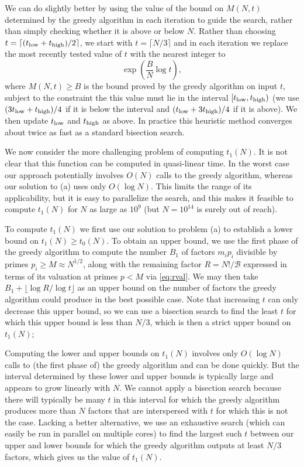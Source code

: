 \documentclass[12pt,a4paper,reqno]{amsart}
\numberwithin{equation}{section}
\theoremstyle{plain}
\theoremstyle{definition}
\newcommand\tuple{{\mathcal B}}
\begin{document}
We can do slightly better by using the value of the bound on $M(N,t)$ determined by the greedy algorithm in each iteration to guide the search, rather than simply checking whether it is above or below $N$.  Rather than choosing $t=\lceil(t_{\rm low}+t_{\rm high})/2\rceil$, we start with $t=\lceil N/3\rceil$ and in each iteration we replace the most recently tested value of $t$ with the nearest integer to
\[
\exp\left(\frac{B}{N}\log t\right),
\]
where $M(N,t)\ge B$ is the bound proved by the greedy algorithm on input $t$,  subject to the constraint the this value must lie in the interval $[t_{\rm low},t_{\rm high})$
(we use $(3t_{\rm low}+t_{\rm high})/4$ if it is below the interval and $(t_{\rm low}+3t_{\rm high})/4$ if it is above).  We then update $t_{\rm low}$ and $t_{\rm high}$ as above.
In practice this heuristic method converges about twice as fast as a standard bisection search.

We now consider the more challenging problem of computing $t_1(N)$.  It is not clear that this function can be computed in quasi-linear time.  In the worst case our approach potentially involves $O(N)$ calls to the greedy algorithm, whereas our solution to (a) uses only $O(\log N)$.  This limits the range of its applicability, but it is easy to parallelize the search, and this makes it feasible to compute $t_1(N)$ for $N$ as large as $10^9$ (but $N=10^{14}$ is surely out of reach).

To compute $t_1(N)$ we first use our solution to problem (a) to establish a lower bound on $t_1(N)\ge t_0(N)$.  To obtain an upper bound, we use the first phase of the greedy algorithm to compute the number $B_1$ of factors $m_ip_i$ divisible by primes $p_i\ge M\approx N^{1/2}$, along with the remaining factor $R=N!/\tuple$ expressed in terms of its valuation at primes $p < M$ via \eqref{eq:rval}.
We may then take $B_1 + \lfloor \log R / \log t\rfloor$ as an upper bound on the number of factors the greedy algorithm could produce in the best possible case. Note that increasing $t$ can only decrease this upper bound, so we can use a bisection search to find the least $t$ for which this upper bound is less than $N/3$, which is then a strict upper bound on $t_1(N)$; 

Computing the lower and upper bounds on $t_1(N)$ involves only $O(\log N)$ calls to (the first phase of) the greedy algorithm and can be done quickly.  But the interval determined by these lower and upper bounds is typically large and appears to grow linearly with $N$.  We cannot apply a bisection search because there will typically be many $t$ in this interval for which the greedy algorithm produces more than $N$ factors that are interspersed with $t$ for which this is not the case.  Lacking a better alternative, we use an exhaustive search (which can easily be run in parallel on multiple cores) to find the largest such $t$ between our upper and lower bounds for which the greedy algorithm outputs at least $N/3$ factors, which gives us the value of $t_1(N)$.
\end{document}
